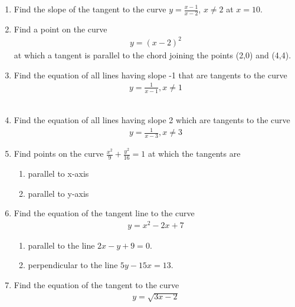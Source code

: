 \begin{enumerate}[label=\thesubsection.\arabic*,ref=\thesubsection.\theenumi]
\item Find the slope of the tangent to the curve $y = \frac{x-1}{x-2}$, $x \neq 2$ at $x=10$.
	\\
\solution 
\label{chapters/12/6/3/2}

\item 
		Find a point on the curve \begin{align}y=(x-2)^2\end{align} at which a tangent is parallel to the chord joining the points (2,0) and (4,4).
			\\
			\solution 
\label{chapters/12/6/3/8}

\item 
Find the equation of all lines having slope  -1 that are tangents to the curve
\begin{align}
y = \frac{1}{x-1}, x \neq 1
\label{chapters/12/6/3/10}
\end{align}
	\\
	\solution 

\item 
Find the equation of all lines having slope 2 which are tangents to the curve 
\begin{align}
y=\frac{1}{x-3}, x\neq{3} 
\end{align}
\item 
 Find points on the curve $\frac{x^2}{9}+\frac{y^2}{16}=1$ at which the tangents are 
 \begin{enumerate}
	 \item parallel to x-axis\\  
	 \item parallel to y-axis
 \end{enumerate}
 \solution 
\label{chapters/12/6/3/13}

\item 
Find the equation of the tangent line to the curve
\begin{align}
y=x^2-2x+7
\end{align}
\begin{enumerate}
    \item parallel to the line $2x-y+9=0$.
    \item perpendicular to the line $5y-15x=13$.
\end{enumerate}
\item 
Find the equation of the tangent to the curve 
\begin{align}
	y = \sqrt{3x-2}
\end{align}

\end{enumerate}
